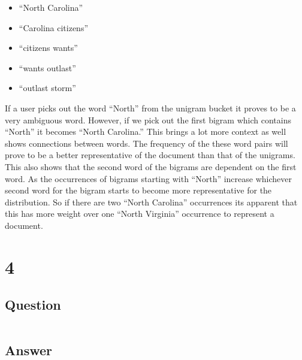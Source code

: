 \documentclass[letterpaper,11pt]{article}
\newcommand*{\srcPath}{../src}%
\begin{document}
\begin{itemize}
  \item ``North Carolina''
  \item ``Carolina citizens''
  \item ``citizens wants''
  \item ``wants outlast''
  \item ``outlast storm''
\end{itemize}

If a user picks out the word ``North'' from the unigram bucket it proves to be a very ambiguous word.
However, if we pick out the first bigram which contains ``North'' it becomes ``North Carolina.''
This brings a lot more context as well shows connections between words.
The frequency of the these word pairs will prove to be a better representative of the document than that of the unigrams.
This also shows that the second word of the bigrams are dependent on the first word.
As the occurrences of bigrams starting with ``North'' increase whichever second word for the bigram starts to become more representative for the distribution.
So if there are two ``North Carolina'' occurrences its apparent that this has more weight over one ``North Virginia'' occurrence to represent a document.

% 

\clearpage


\section*{4}

\subsection*{Question}

\begin{verbatim}

\end{verbatim}

\subsection*{Answer}
\end{document}
